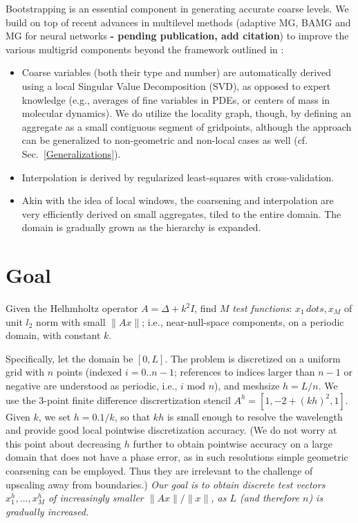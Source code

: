 \documentclass{article}
\begin{document}
Bootstrapping is an essential component in generating accurate coarse levels. We build on top of recent advances in multilevel methods (adaptive MG, BAMG \cite{bamg, lamg, mg_guide} and MG for neural networks \textbf{- pending publication, add citation}) to improve the various multigrid components beyond the framework outlined in \cite{su}:
\begin{itemize}
	\item Coarse variables (both their type and number) are automatically derived using a local Singular Value Decomposition (SVD), as opposed to expert knowledge (e.g., averages of fine variables in PDEs, or centers of mass in molecular dynamics). We do utilize the locality graph, though, by defining an aggregate as a small contiguous segment of gridpoints, although the approach can be generalized to non-geometric and non-local cases as well (cf. Sec.~\ref{Generalizations}).
	\item Interpolation is derived by regularized least-squares with cross-validation.
	\item Akin with the idea of local windows, the coarsening and interpolation are very efficiently derived on small aggregates, tiled to the entire domain. The domain is gradually grown as the hierarchy is expanded.
\end{itemize}

\section{Goal}
Given the Helhmholtz operator $A = \Delta + k^2 I$, find $M$ \emph{test functions}: $x_1\,dots,x_M$ of unit $l_2$ norm with small $\|A x\|$; i.e., near-null-space components, on a periodic domain, with constant $k$. 

Specifically, let the domain be $[0,L]$. The problem is discretized on a uniform grid with $n$ points (indexed $i = 0..n-1$; references to indices larger than $n - 1$ or negative are understood as periodic, i.e., $i \text{ mod } n$), and meshsize $h = L/n$. We use the 3-point finite difference discrertization stencil $A^h = [1, -2 + (kh)^2, 1]$. Given $k$, we set $h = 0.1/k$, so that $kh$ is small enough to resolve the wavelength and provide good local pointwise discretization accuracy. (We do not worry at this point about decreasing $h$ further to obtain pointwise accuracy on a large domain that does not have a phase error, as in such resolutions simple geometric coarsening can be employed. Thus they are irrelevant to the challenge of upscaling away from boundaries.) \emph{Our goal is to obtain discrete test vectors $x^h_1,\dots,x^h_M$ of increasingly smaller $\|A x\|/\|x\|$, as $L$ (and therefore $n$) is gradually increased.}
\end{document}
